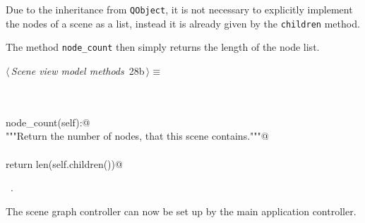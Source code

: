 \documentclass[
    a4paper,      %
    10pt,         %
    openright,    %
    notitlepage,  %
    parskip=half, %
]{scrreprt}       %
\theoremstyle{definition}                    %
\begin{document}
Due to the inheritance from \verb+QObject+, it is not necessary to explicitly
implement the nodes of a scene as a list, instead it is already given by the \verb+children+ method.

The method \verb+node_count+ then simply returns the length of the node list.

\begin{flushleft} \small
\begin{minipage}{\linewidth}\label{scrap25}\raggedright\small
{} $\langle\,${\itshape Scene view model methods}\nobreak\ {\footnotesize {28b}}$\,\rangle\equiv$
\vspace{-1ex}
\begin{list}{}{} \item
\mbox{}\lstinline@@\\
\mbox{}\lstinline@property@\\
\mbox{}\lstinline@def node_count(self):@\\
\mbox{}\lstinline@    """Return the number of nodes, that this scene contains."""@\\
\mbox{}\lstinline@@\\
\mbox{}\lstinline@    return len(self.children())@\\
\mbox{}\lstinline@@{\NWsep}
\end{list}
\vspace{-1.5ex}
\footnotesize
\begin{list}{}{\setlength{\itemsep}{-\parsep}\setlength{\itemindent}{-\leftmargin}}
\item \NWtxtMacroRefIn\ .

\item{}
\end{list}
\end{minipage}\vspace{4ex}
\end{flushleft}


The scene graph controller can now be set up by the main application controller.
\end{document}
